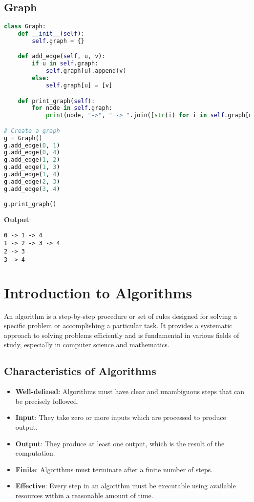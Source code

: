 \documentclass{article}
\begin{document}
\subsection{Graph}

\begin{lstlisting}[language=Python, caption=Graph implementation using adjacency list]
class Graph:
    def __init__(self):
        self.graph = {}

    def add_edge(self, u, v):
        if u in self.graph:
            self.graph[u].append(v)
        else:
            self.graph[u] = [v]

    def print_graph(self):
        for node in self.graph:
            print(node, "->", " -> ".join([str(i) for i in self.graph[node]]))

# Create a graph
g = Graph()
g.add_edge(0, 1)
g.add_edge(0, 4)
g.add_edge(1, 2)
g.add_edge(1, 3)
g.add_edge(1, 4)
g.add_edge(2, 3)
g.add_edge(3, 4)

g.print_graph()
\end{lstlisting}

\textbf{Output}:
\begin{verbatim}
0 -> 1 -> 4
1 -> 2 -> 3 -> 4
2 -> 3
3 -> 4
\end{verbatim}
\section{Introduction to Algorithms}

An algorithm is a step-by-step procedure or set of rules designed for solving a specific problem or accomplishing a particular task. It provides a systematic approach to solving problems efficiently and is fundamental in various fields of study, especially in computer science and mathematics.

\subsection{Characteristics of Algorithms}

\begin{itemize}
    \item \textbf{Well-defined}: Algorithms must have clear and unambiguous steps that can be precisely followed.
    \item \textbf{Input}: They take zero or more inputs which are processed to produce output.
    \item \textbf{Output}: They produce at least one output, which is the result of the computation.
    \item \textbf{Finite}: Algorithms must terminate after a finite number of steps.
    \item \textbf{Effective}: Every step in an algorithm must be executable using available resources within a reasonable amount of time.
\end{itemize}
\end{document}
